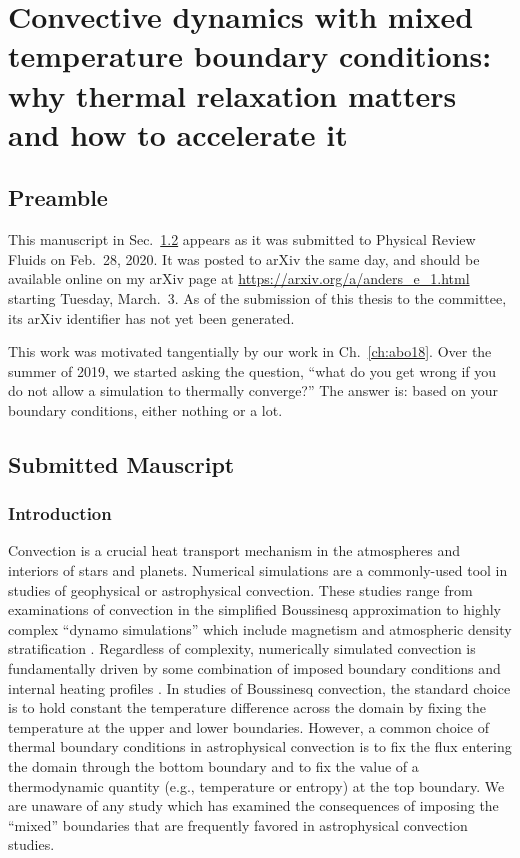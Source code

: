 \chapter{Convective dynamics with mixed temperature boundary conditions: why thermal relaxation matters and how to accelerate it}
\label{ch:FT20}

\section{Preamble}
This manuscript in Sec.~\ref{sec:ft20_manuscript} appears as it was submitted to Physical Review Fluids on Feb.~28, 2020.
It was posted to arXiv the same day, and should be available online on my arXiv page at \url{https://arxiv.org/a/anders_e_1.html} starting Tuesday, March.~3.
As of the submission of this thesis to the committee, its arXiv identifier has not yet been generated.

This work was motivated tangentially by our work in Ch.~\ref{ch:abo18}.
Over the summer of 2019, we started asking the question, ``what do you get wrong if you do not allow a simulation to thermally converge?''
The answer is: based on your boundary conditions, either nothing or a lot.


\section{Submitted Mauscript}
\label{sec:ft20_manuscript}


\subsection{Introduction}
\label{sec:ft20_introduction}
Convection is a crucial heat transport mechanism in the atmospheres and interiors of stars and planets.
Numerical simulations are a commonly-used tool in studies of geophysical or astrophysical convection.
These studies range from examinations of convection in the simplified Boussinesq approximation \citep{spiegel&veronis1960, ahlers&all2009, plumley&julien2019} to highly complex ``dynamo simulations'' which include magnetism and atmospheric density stratification \citep{charbonneau2014, toomre2019}.
Regardless of complexity, numerically simulated convection is fundamentally driven by some combination of imposed boundary conditions and internal heating profiles \citep{goluskin2016}.
In studies of Boussinesq convection, the standard choice is to hold constant the temperature difference across the domain by fixing the temperature at the upper and lower boundaries.
However, a common choice of thermal boundary conditions in astrophysical convection \citep{glatzmaier&gilman1982, hurlburt&all1986, cattaneo&all1990, featherstone&hindman2016a, korre&all2019, wood&brummell2018, kapyla&all2019} is to fix the flux entering the domain through the bottom boundary and to fix the value of a thermodynamic quantity (e.g., temperature or entropy) at the top boundary.
We are unaware of any study which has examined the consequences of imposing the ``mixed'' boundaries that are frequently favored in astrophysical convection studies.

